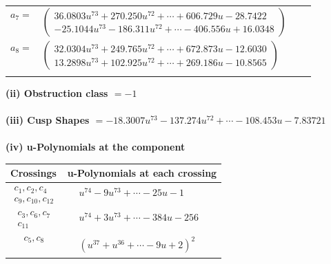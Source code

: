 \documentclass[1p]{elsarticle_modified}
\theoremstyle{definition}
\begin{document}
\begin{tabular}{m{7pt} m{180pt} m{7pt} m{180pt} }
\flushright $a_{7}=$&$\begin{pmatrix}36.0803 u^{73}+270.250 u^{72}+\cdots+606.729 u-28.7422\\-25.1044 u^{73}-186.311 u^{72}+\cdots-406.556 u+16.0348\end{pmatrix}$ \\
\flushright $a_{8}=$&$\begin{pmatrix}32.0304 u^{73}+249.765 u^{72}+\cdots+672.873 u-12.6030\\13.2898 u^{73}+102.925 u^{72}+\cdots+269.186 u-10.8565\end{pmatrix}$\\&\end{tabular}
\flushleft \textbf{(ii) Obstruction class $= -1$}\\~\\
\flushleft \textbf{(iii) Cusp Shapes $= -18.3007 u^{73}-137.274 u^{72}+\cdots-108.453 u-7.83721$}\\~\\
\newpage\renewcommand{\arraystretch}{1}
\flushleft \textbf{(iv) u-Polynomials at the component}\newline \\
\begin{tabular}{m{50pt}|m{274pt}}
Crossings & \hspace{64pt}u-Polynomials at each crossing \\
\hline $$\begin{aligned}c_{1},c_{2},c_{4}\\c_{9},c_{10},c_{12}\end{aligned}$$&$\begin{aligned}
&u^{74}-9 u^{73}+\cdots-25 u-1
\end{aligned}$\\
\hline $$\begin{aligned}c_{3},c_{6},c_{7}\\c_{11}\end{aligned}$$&$\begin{aligned}
&u^{74}+3 u^{73}+\cdots-384 u-256
\end{aligned}$\\
\hline $$\begin{aligned}c_{5},c_{8}\end{aligned}$$&$\begin{aligned}
&(u^{37}+u^{36}+\cdots-9 u+2)^{2}
\end{aligned}$\\
\hline
\end{tabular}\\~\\
\end{document}

